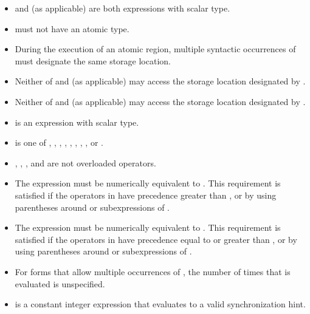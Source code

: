 \begin{ccppspecific}
\begin{itemize}
\item {} and  (as applicable) are both  expressions 
      with scalar type.
\item {} must not have an atomic type.
\item During the execution of an atomic region, multiple syntactic occurrences 
      of  must designate the same storage location.
\item Neither of  and  (as applicable) may access the storage 
      location designated by .
\item Neither of  and  (as applicable) may access the storage 
      location designated by .
\item {} is an expression with scalar type.
\item {} is one of \code{+}, \code{*}, \code{-}, \code{/},
      \code{&}, \code{^}, \code{|}, \code{<}\code{<}, or \code{>}\code{>}.
\item {}, \code{=}, \code{++}, and \code{-}\code{-} are not
      overloaded operators.
\item The expression    must be numerically 
      equivalent to   . This requirement is 
      satisfied if the operators in  have precedence greater than 
      , or by using parentheses around  or 
      subexpressions of .
\item The expression    must be numerically 
      equivalent to   . This requirement is 
      satisfied if the operators in  have precedence equal to or 
      greater than , or by using parentheses around  
      or subexpressions of .
\item For forms that allow multiple occurrences of , the number of 
      times that  is evaluated is unspecified.
\item {} is a constant integer expression that evaluates 
      to a valid synchronization hint.
\end{itemize}

\end{ccppspecific}

